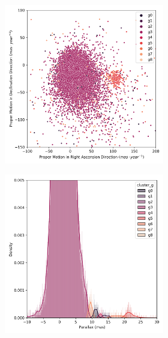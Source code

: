 \documentclass[11pt,a4paper,english,twocolumn]{article}
\begin{document}
\begin{figure}[htbp]
  \centering
  \begin{subfigure}{\columnwidth}
    \centering
    \begin{subfigure}[t]{0.30\textwidth}
      \centering
      \includegraphics[width=\textwidth]{../figures/melotte_25/dec_pm_melotte_25.png}
    \end{subfigure}
    \hfill
    \begin{subfigure}[t]{0.30\textwidth}
      \centering
      \includegraphics[width=\textwidth]{../figures/melotte_25/dec_parallax_melotte_25.png}

\end{subfigure}
\end{subfigure}
\end{figure}
\end{document}
